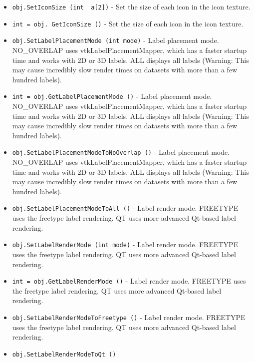 \begin{itemize}
\item  \verb|obj.SetIconSize (int  a[2])| -  Set the size of each icon in the icon texture.

\item  \verb|int = obj. GetIconSize ()| -  Set the size of each icon in the icon texture.

\item  \verb|obj.SetLabelPlacementMode (int mode)| -  Label placement mode.
 NO\_OVERLAP uses vtkLabelPlacementMapper, which has a faster startup time and
 works with 2D or 3D labels.
 ALL displays all labels (Warning: This may cause incredibly slow render
 times on datasets with more than a few hundred labels).

\item  \verb|int = obj.GetLabelPlacementMode ()| -  Label placement mode.
 NO\_OVERLAP uses vtkLabelPlacementMapper, which has a faster startup time and
 works with 2D or 3D labels.
 ALL displays all labels (Warning: This may cause incredibly slow render
 times on datasets with more than a few hundred labels).

\item  \verb|obj.SetLabelPlacementModeToNoOverlap ()| -  Label placement mode.
 NO\_OVERLAP uses vtkLabelPlacementMapper, which has a faster startup time and
 works with 2D or 3D labels.
 ALL displays all labels (Warning: This may cause incredibly slow render
 times on datasets with more than a few hundred labels).

\item  \verb|obj.SetLabelPlacementModeToAll ()| -  Label render mode.
 FREETYPE uses the freetype label rendering.
 QT uses more advanced Qt-based label rendering.

\item  \verb|obj.SetLabelRenderMode (int mode)| -  Label render mode.
 FREETYPE uses the freetype label rendering.
 QT uses more advanced Qt-based label rendering.

\item  \verb|int = obj.GetLabelRenderMode ()| -  Label render mode.
 FREETYPE uses the freetype label rendering.
 QT uses more advanced Qt-based label rendering.

\item  \verb|obj.SetLabelRenderModeToFreetype ()| -  Label render mode.
 FREETYPE uses the freetype label rendering.
 QT uses more advanced Qt-based label rendering.

\item  \verb|obj.SetLabelRenderModeToQt ()|

\end{itemize}

